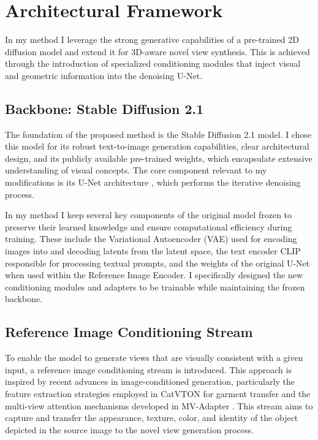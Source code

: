 \section{Architectural Framework}\label{sec:architectural-framework}
In my method I leverage the strong generative capabilities of a pre-trained 2D diffusion model and extend it for 3D-aware novel view synthesis. This is achieved through the introduction of specialized conditioning modules that inject visual and geometric information into the denoising U-Net.

\subsection{Backbone: Stable Diffusion 2.1}
The foundation of the proposed method is the Stable Diffusion 2.1 model. I chose this model for its robust text-to-image generation capabilities, clear architectural design, and its publicly available pre-trained weights, which encapsulate extensive understanding of visual concepts. The core component relevant to my modifications is its U-Net architecture \cite{unet}, which performs the iterative denoising process.

In my method I keep several key components of the original model frozen to preserve their learned knowledge and ensure computational efficiency during training. These include the Variational Autoencoder (VAE) \cite{vae} used for encoding images into and decoding latents from the latent space, the text encoder CLIP \cite{clip} responsible for processing textual prompts, and the weights of the original U-Net when used within the Reference Image Encoder. I specifically designed the new conditioning modules and adapters to be trainable while maintaining the frozen backbone.

\subsection{Reference Image Conditioning Stream}
To enable the model to generate views that are visually consistent with a given input, a reference image conditioning stream is introduced. This approach is inspired by recent advances in image-conditioned generation, particularly the feature extraction strategies employed in CatVTON \cite{catvton} for garment transfer and the multi-view attention mechanisms developed in MV-Adapter \cite{mvadapter}. This stream aims to capture and transfer the appearance, texture, color, and identity of the object depicted in the source image to the novel view generation process.

